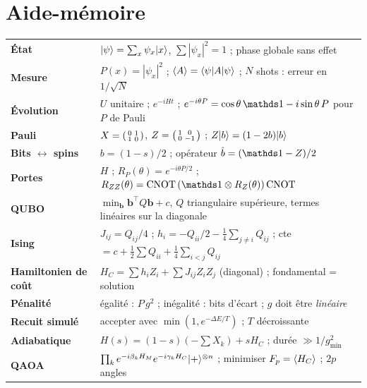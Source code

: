 \chapter{Aide-mémoire}\label{annexe:memo}

\begin{center}
\renewcommand{\arraystretch}{1.3}
\begin{tabularx}{\linewidth}{>{\raggedright\arraybackslash}p{4.3cm}X}
\toprule
\textbf{État} & $\lvert \psi\rangle=\sum_x\psi_x\lvert x\rangle$, $\sum|\psi_x|^2=1$ ; phase globale sans effet\\
\textbf{Mesure} & $P(x)=|\psi_x|^2$ ; $\langle A\rangle=\langle \psi\rvert A\lvert \psi\rangle$ ; $N$ shots : erreur en $1/\sqrt N$\\
\textbf{Évolution} & $U$ unitaire ; $e^{-iHt}$ ; $e^{-i\theta P}=\cos\theta\,\Id-i\sin\theta\,P$ pour $P$ de Pauli\\
\textbf{Pauli} & $X=\begin{psmallmatrix}0&1\\1&0\end{psmallmatrix}$, $Z=\begin{psmallmatrix}1&0\\0&-1\end{psmallmatrix}$ ; $Z\lvert b\rangle=(1-2b)\lvert b\rangle$\\
\textbf{Bits $\leftrightarrow$ spins} & $b=(1-s)/2$ ; opérateur $\hat b=(\Id-Z)/2$\\
\textbf{Portes} & $H$ ; $R_P(\theta)=e^{-i\theta P/2}$ ; $R_{ZZ}(\theta)=\mathrm{CNOT}\,(\Id\otimes R_Z(\theta))\,\mathrm{CNOT}$\\
\textbf{QUBO} & $\min_{\mathbf b}\mathbf b^\top Q\mathbf b+c$, $Q$ triangulaire supérieure, termes linéaires sur la diagonale\\
\textbf{Ising} & $J_{ij}=Q_{ij}/4$ ; $h_i=-Q_{ii}/2-\tfrac14\sum_{j\neq i}Q_{ij}$ ; cte $=c+\tfrac12\sum Q_{ii}+\tfrac14\sum_{i<j}Q_{ij}$\\
\textbf{Hamiltonien de coût} & $H_C=\sum h_iZ_i+\sum J_{ij}Z_iZ_j$ (diagonal) ; fondamental = solution\\
\textbf{Pénalité} & égalité : $P\,g^2$ ; inégalité : bits d'écart ; $g$ doit être \emph{linéaire}\\
\textbf{Recuit simulé} & accepter avec $\min(1,e^{-\Delta E/T})$ ; $T$ décroissante\\
\textbf{Adiabatique} & $H(s)=(1-s)(-\sum X_k)+sH_C$ ; durée $\gg1/g_{\min}^2$\\
\textbf{QAOA} & $\prod_k e^{-i\beta_kH_M}e^{-i\gamma_kH_C}\lvert +\rangle^{\otimes n}$ ; minimiser $F_p=\langle H_C\rangle$ ; $2p$ angles\\

\end{tabularx}
\end{center}

